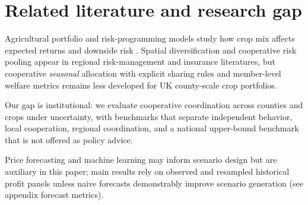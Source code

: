 \section{Related literature and research gap}
\label{sec:literature}

Agricultural portfolio and risk-programming models study how crop mix affects expected
returns and downside risk \citep{hardaker2015,Bradford1997}.
Spatial diversification and cooperative risk pooling appear in regional risk-management
and insurance literatures, but cooperative \emph{seasonal} allocation with explicit
sharing rules and member-level welfare metrics remains less developed for UK county-scale
crop portfolios.

Our gap is institutional: we evaluate cooperative coordination across counties and crops
under uncertainty, with benchmarks that separate independent behavior, local cooperation,
regional coordination, and a national upper-bound benchmark that is not offered as policy advice.

Price forecasting and machine learning may inform scenario design but are auxiliary in this
paper; main results rely on observed and resampled historical profit panels unless naive
forecasts demonstrably improve scenario generation (see appendix forecast metrics).
